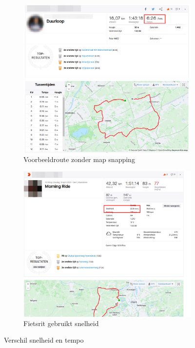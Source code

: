 \begin{figure}[h]
    \centering
    \begin{subfigure}[b]{.5\textwidth}
        \centering
        \caption{Voorbeeldroute zonder map snapping}
        \includegraphics[width=\textwidth]{fig/SpeedVSPace/Pace.png}
    \end{subfigure}\hfill
    \begin{subfigure}[b]{.5\textwidth}
        \centering
        \caption{Fietsrit gebruikt snelheid}
        \includegraphics[width=\textwidth]{fig/SpeedVSPace/Speed.png}
    \end{subfigure}
    \caption{Verschil snelheid en tempo}\label{fig:speedvspace}
\end{figure}


